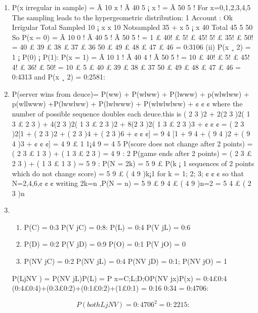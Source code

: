 \documentclass[a4paper,12pt]{article}
\begin{document}
\begin{enumerate}
\item P(x irregular in sample) =
Ã
10
x
! Ã
40
5 ¡ x
!
=
Ã
50
5
!
For x=0,1,2,3,4,5
The sampling leads to the hypergeometric distribution:
1
Account : Ok Irrigular Total
Sampled 10 ¡ x x 10
Notsampled 35 + x 5 ¡ x 40
Total 45 5 50
So
P(x = 0) =
Ã
10
0
! Ã
40
5
!
Ã
50
5
! =
1 £ 40! £ 5! £ 45!
5! £ 35! £ 50!
=
40 £ 39 £ 38 £ 37 £ 36
50 £ 49 £ 48 £ 47 £ 46
= 0:3106
(ii)
P(x ¸ 2) = 1 ¡ P(0) ¡ P(1):
P(x = 1) =
Ã
10
1
! Ã
40
4
!
Ã
50
5
! =
10 £ 40! £ 5! £ 45!
4! £ 36! £ 50!
=
10 £ 5 £ 40 £ 39 £ 38 £ 37
50 £ 49 £ 48 £ 47 £ 46
= 0:4313
and P(x ¸ 2) = 0:2581:
\item P(server wins from deuce)=
P(ww) + P(wlww) + P(lwww) + p(wlwlww) + p(wllwww)
+P(lwwlww) + P(lwlwww) + P(wlwlwlww) + ¢ ¢ ¢
where the number of possible sequence doubles each deuce.this is
( 2
3 )2 + 2(2
3 )2( 1
3 £ 2
3 ) + 4(2
3 )2( 1
3 £ 2
3 )2 + 8(2
3 )2( 1
3 £ 2
3 )3 + ¢ ¢ ¢
= ( 2
3 )2[1 + ( 2
3 )2 + ( 2
3 )4 + ( 2
3 )6 + ¢ ¢ ¢]
= 9
4 [1 + 9
4 + ( 9
4 )2 + ( 9
4 )3 + ¢ ¢ ¢] = 4
9 £ 1
1¡4
9
= 4
5
P(score does not change after 2 points) = ( 2
3 £ 1
3 ) + ( 1
3 £ 2
3 ) = 4
9 :
2
P(game ends after 2 points) = ( 2
3 £ 2
3 ) + ( 1
3 £ 1
3 ) = 5
9 :
P(N = 2k) = 5
9 £ P(k ¡ 1 sequences of 2 points which do not change score)
= 5
9 £ ( 4
9 )k¡1 for k = 1; 2; 3; ¢ ¢ ¢
so that N=2,4,6,¢ ¢ ¢
writing 2k=n ,P(N = n) = 5
9 £ 9
4 £ ( 4
9 )n=2 = 5
4 £ ( 2
3 )n
\item

\begin{enumerate}
    \item P(C) = 0:3 P(V jC) = 0:8: P(L) = 0:4 P(V jL) = 0:6
    \item P(D) = 0:2 P(V jD) = 0:9 P(O) = 0:1 P(V jO) = 0
    \item P(NV jC) = 0:2 P(NV jL) = 0:4 P(NV jD) = 0:1; P(NV jO) = 1
\end{enumerate}

P(LjNV ) = P(NV jL)P(L) =
P
x=C;L;D;OP(NV jx)P(x)
= 0:4£0:4
(0:4£0:4)+(0:3£0:2)+(0:1£0:2)+(1£0:1) = 0:16
0:34 = 0:4706:

\[P(both LjNV ) = 0:4706^2 = 0:2215:\]

\end{enumerate}
\end{document}
